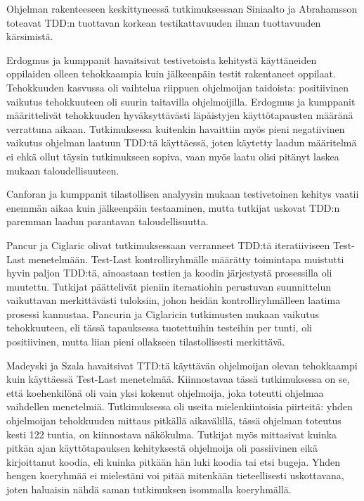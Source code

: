 \documentclass[finnish]{tktltiki2}
\theoremstyle{definition}
\theoremstyle{remark}
\begin{document}
Ohjelman rakenteeseen keskittyneessä tutkimuksessaan Siniaalto ja Abrahamsson \cite{Siniaalto07} toteavat TDD:n tuottavan korkean testikattavuuden ilman tuottavuuden kärsimistä.

Erdogmus ja kumppanit \cite{Erdogmus05} havaitsivat testivetoista kehitystä käyttäneiden oppilaiden olleen tehokkaampia kuin jälkeenpäin testit rakentaneet oppilaat. Tehokkuuden kasvussa oli vaihtelua riippuen ohjelmoijan taidoista: positiivinen vaikutus tehokkuuteen oli suurin taitavilla ohjelmoijilla. Erdogmus ja kumppanit määrittelivät tehokkuuden hyväksyttävästi läpäistyjen käyttötapausten määränä verrattuna aikaan. Tutkimuksessa kuitenkin havaittiin myös pieni negatiivinen vaikutus ohjelman laatuun TDD:tä käyttäessä, joten käytetty laadun määritelmä ei ehkä ollut täysin tutkimukseen sopiva, vaan myös laatu olisi pitänyt laskea mukaan taloudellisuuteen.

Canforan ja kumppanit \cite{Canfora06} tilastollisen analyysin mukaan testivetoinen kehitys vaatii enemmän aikaa kuin jälkeenpäin testaaminen, mutta tutkijat uskovat TDD:n paremman laadun parantavan taloudellisuutta.

Pancur ja Ciglaric \cite{Pancur11} olivat tutkimuksessaan verranneet TDD:tä iteratiiviseen Test-Last menetelmään. Test-Last kontrolliryhmälle määrätty toimintapa muistutti hyvin paljon TDD:tä, ainoastaan testien ja koodin järjestystä prosessilla oli muutettu. Tutkijat päättelivät pieniin iteraatiohin perustuvan suunnittelun vaikuttavan merkittävästi tuloksiin, johon heidän kontrolliryhmälleen laatima prosessi kannustaa. Pancurin ja Ciglaricin tutkimusten mukaan vaikutus tehokkuuteen, eli tässä tapauksessa tuotettuihin testeihin per tunti,  oli positiivinen, mutta liian pieni ollakseen tilastollisesti merkittävä.

Madeyski ja Szala \cite{Madeyski07} havaitsivat TTD:tä käyttävän ohjelmoijan olevan tehokkaampi kuin käyttäessä Test-Last menetelmää. Kiinnostavaa tässä tutkimuksessa on se, että koehenkilönä oli vain yksi kokenut ohjelmoija, joka toteutti ohjelmaa vaihdellen menetelmiä. Tutkimuksessa oli useita mielenkiintoisia piirteitä: yhden ohjelmoijan tehokkuuden mittaus pitkällä aikavälillä, tässä ohjelman toteutus kesti 122 tuntia, on kiinnostava näkökulma. Tutkijat myös mittasivat kuinka pitkän ajan käyttötapauksen kehityksestä ohjelmoija oli passiivinen eikä kirjoittanut koodia, eli kuinka pitkään hän luki koodia tai etsi bugeja. Yhden hengen koeryhmää ei mielestäni voi pitää mitenkään tieteellisesti uskottavana, joten haluaisin nähdä saman tutkimuksen isommalla koeryhmällä.
\end{document}
